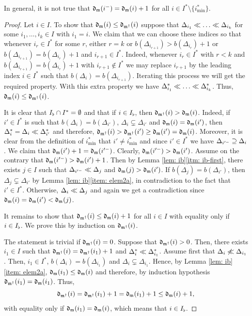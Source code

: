\documentclass{ert-l} %
\begin{document}
\begin{remark}
In general, it is not true that $\mathfrak{d}_{\mathfrak{m}}(i^-)=\mathfrak{d}_{\mathfrak{m}}(i)+1$
for all $i\in I^*\setminus\{i^*_{\min}\}$.
\end{remark}

\begin{proof}
Let $i\in I$.
To show that $\mathfrak{d}_{\mathfrak{m}}(i)\le\mathfrak{d}_{\mathfrak{m}^{\dagger}}(i)$ suppose that
$\Delta_{i_1}\smlr\dots\smlr\Delta_{i_k}$ for some $i_1,\dots,i_k\in I$ with $i_1=i$.
We claim that we can choose these indices so that whenever $i_r\in I^*$
for some $r$, either $r=k$ or $b(\Delta_{i_{r+1}})>b(\Delta_{i_r})+1$ or
$b(\Delta_{i_{r+1}})=b(\Delta_{i_r})+1$ and $i_{r+1}\in I^*$.
Indeed, whenever $i_r\in I^*$ with $r<k$ and $b(\Delta_{i_{r+1}})=b(\Delta_{i_r})+1$ with $i_{r+1}\notin I^*$
we may replace $i_{r+1}$ by the leading index $i\in I^*$ such that $b(\Delta_i)=b(\Delta_{i_{r+1}})$.
Iterating this process we will get the required property. With this extra property we have
$\Delta^*_{i_1}\smlr\dots\smlr\Delta^*_{i_k}$. Thus, $\mathfrak{d}_{\mathfrak{m}}(i)\le\mathfrak{d}_{\mathfrak{m}^{\dagger}}(i)$.

It is clear that $I_{\flat}\cap I^*=\emptyset$ and that if $i\in I_{\flat}$, then $\mathfrak{d}_{\mathfrak{m}^{\dagger}}(i)>\mathfrak{d}_{\mathfrak{m}}(i)$.
Indeed, if $i'\in I^*$ is such that $b(\Delta_i)=b(\Delta_{i'})$, $\Delta_i\subsetneq\Delta_{i'}$
and $\mathfrak{d}_{\mathfrak{m}}(i)=\mathfrak{d}_{\mathfrak{m}}(i')$, then $\Delta_i^*=\Delta_i\ll\Delta^*_{i'}$ and therefore,
$\mathfrak{d}_{\mathfrak{m}^{\dagger}}(i)>\mathfrak{d}_{\mathfrak{m}^{\dagger}}(i')\ge \mathfrak{d}_{\mathfrak{m}}(i')=\mathfrak{d}_{\mathfrak{m}}(i)$.
Moreover, it is clear from the definition of $i^*_{\min}$ that $i'\neq i^*_{\min}$ and since $i'\in I^*$ we have $\Delta_{i'^-}\supseteq\Delta_i$. We claim that
$\mathfrak{d}_{\mathfrak{m}}(i')+1=\mathfrak{d}_{\mathfrak{m}}(i'^-)$. Clearly,
$\mathfrak{d}_{\mathfrak{m}}(i'^-)>\mathfrak{d}_{\mathfrak{m}}(i')$. Assume on the contrary that $\mathfrak{d}_{\mathfrak{m}}(i'^-)>\mathfrak{d}_{\mathfrak{m}}(i')+1$.
Then by Lemma \ref{lem: ib}\eqref{itm: ib-first}, there exists $j\in I$ such that
$\Delta_{i'^-}\ll\Delta_j$ and $\mathfrak{d}_{\mathfrak{m}}(j)>\mathfrak{d}_{\mathfrak{m}}(i')$.
If $b(\Delta_j)=b(\Delta_{i'})$, then $\Delta_j\subsetneq \Delta_{i'}$ by Lemma \ref{lem: ib}\eqref{item: elem2a},
in contradiction to the fact that $i'\in I^*$. Otherwise, $\Delta_i\ll\Delta_j$
and again we get a contradiction since $\mathfrak{d}_{\mathfrak{m}}(i)=\mathfrak{d}_{\mathfrak{m}}(i')<\mathfrak{d}_{\mathfrak{m}}(j)$.


It remains to show that $\mathfrak{d}_{\mathfrak{m}^{\dagger}}(i)\le\mathfrak{d}_{\mathfrak{m}}(i)+1$ for all $i\in I$
with equality only if $i\in I_{\flat}$.
We prove this by induction on $\mathfrak{d}_{\mathfrak{m}^{\dagger}}(i)$.

The statement is trivial if $\mathfrak{d}_{\mathfrak{m}^{\dagger}}(i)=0$. Suppose that $\mathfrak{d}_{\mathfrak{m}^{\dagger}}(i)>0$.
Then, there exists $i_1\in I$ such that $\mathfrak{d}_{\mathfrak{m}^{\dagger}}(i)=\mathfrak{d}_{\mathfrak{m}^{\dagger}}(i_1)+1$ and $\Delta^*_{i}\ll\Delta^*_{i_1}$.
Assume first that $\Delta_i\not\ll\Delta_{i_1}$. Then, $i_1\in I^*$, $b(\Delta_i)=b(\Delta_{i_1})$ and $\Delta_i\subsetneq\Delta_{i_1}$.
Hence, by Lemma \ref{lem: ib}\eqref{item: elem2a}, $\mathfrak{d}_{\mathfrak{m}}(i_1)\le\mathfrak{d}_{\mathfrak{m}}(i)$ and therefore, by induction hypothesis $\mathfrak{d}_{\mathfrak{m}^{\dagger}}(i_1)=\mathfrak{d}_{\mathfrak{m}}(i_1)$.
Thus,
\[
\mathfrak{d}_{\mathfrak{m}^{\dagger}}(i)=\mathfrak{d}_{\mathfrak{m}^{\dagger}}(i_1)+1=\mathfrak{d}_{\mathfrak{m}}(i_1)+1\le\mathfrak{d}_{\mathfrak{m}}(i)+1,
\]
with equality only if $\mathfrak{d}_{\mathfrak{m}}(i_1)=\mathfrak{d}_{\mathfrak{m}}(i)$, which means that $i\in I_{\flat}$.


\end{proof}
\end{document}
